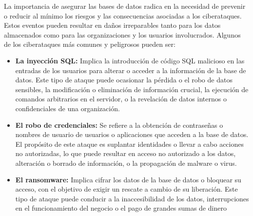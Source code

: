 \documentclass[11pt]{report}
\begin{document}
La importancia de asegurar las bases de datos radica en la necesidad de prevenir o reducir
al mínimo los riesgos y las consecuencias asociadas a los ciberataques. Estos eventos
pueden resultar en daños irreparables tanto para los datos almacenados como para las
organizaciones y los usuarios involucrados. Algunos de los ciberataques más comunes y
peligrosos pueden ser:

\begin{itemize}
\item \textbf{La inyección SQL:} Implica la introducción de código SQL malicioso en las entradas
de los usuarios para alterar o acceder a la información de la base de datos. Este tipo
de ataque puede ocasionar la pérdida o el robo de datos sensibles, la modificación o
eliminación de información crucial, la ejecución de comandos arbitrarios en el
servidor, o la revelación de datos internos o confidenciales de una organización.
\item \textbf{El robo de credenciales:} Se refiere a la obtención de contraseñas o nombres de
usuario de usuarios o aplicaciones que acceden a la base de datos. El propósito de
este ataque es suplantar identidades o llevar a cabo acciones no autorizadas, lo que
puede resultar en acceso no autorizado a los datos, alteración o borrado de
información, o la propagación de malware o virus.
\item \textbf{El ransomware:} Implica cifrar los datos de la base de datos o bloquear su acceso,
con el objetivo de exigir un rescate a cambio de su liberación. Este tipo de ataque
puede conducir a la inaccesibilidad de los datos, interrupciones en el funcionamiento
del negocio o el pago de grandes sumas de dinero
\end{itemize}
\end{document}
